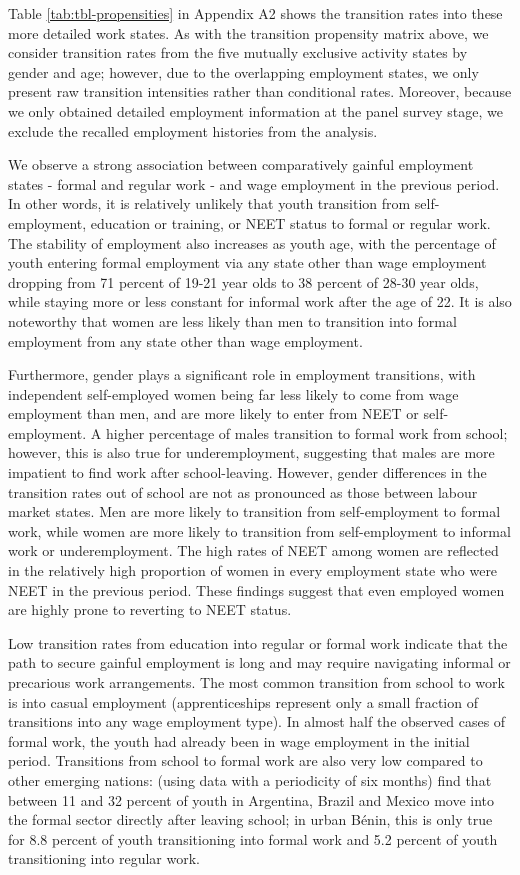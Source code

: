 \documentclass[
  a4paper, twoside, 12pt]{book}
\begin{document}
Table \ref{tab:tbl-propensities} in Appendix A2 shows the transition rates into these more detailed work states. As with the transition propensity matrix above, we consider transition rates from the five mutually exclusive activity states by gender and age; however, due to the overlapping employment states, we only present raw transition intensities rather than conditional rates. Moreover, because we only obtained detailed employment information at the panel survey stage, we exclude the recalled employment histories from the analysis.

We observe a strong association between comparatively gainful employment states - formal and regular work - and wage employment in the previous period. In other words, it is relatively unlikely that youth transition from self-employment, education or training, or NEET status to formal or regular work. The stability of employment also increases as youth age, with the percentage of youth entering formal employment via any state other than wage employment dropping from 71 percent of 19-21 year olds to 38 percent of 28-30 year olds, while staying more or less constant for informal work after the age of 22. It is also noteworthy that women are less likely than men to transition into formal employment from any state other than wage employment.

Furthermore, gender plays a significant role in employment transitions, with independent self-employed women being far less likely to come from wage employment than men, and are more likely to enter from NEET or self-employment. A higher percentage of males transition to formal work from school; however, this is also true for underemployment, suggesting that males are more impatient to find work after school-leaving. However, gender differences in the transition rates out of school are not as pronounced as those between labour market states. Men are more likely to transition from self-employment to formal work, while women are more likely to transition from self-employment to informal work or underemployment. The high rates of NEET among women are reflected in the relatively high proportion of women in every employment state who were NEET in the previous period. These findings suggest that even employed women are highly prone to reverting to NEET status.

Low transition rates from education into regular or formal work indicate that the path to secure gainful employment is long and may require navigating informal or precarious work arrangements. The most common transition from school to work is into casual employment (apprenticeships represent only a small fraction of transitions into any wage employment type). In almost half the observed cases of formal work, the youth had already been in wage employment in the initial period. Transitions from school to formal work are also very low compared to other emerging nations: \textcite{cunningham2011} (using data with a periodicity of six months) find that between 11 and 32 percent of youth in Argentina, Brazil and Mexico move into the formal sector directly after leaving school; in urban Bénin, this is only true for 8.8 percent of youth transitioning into formal work and 5.2 percent of youth transitioning into regular work.
\end{document}
